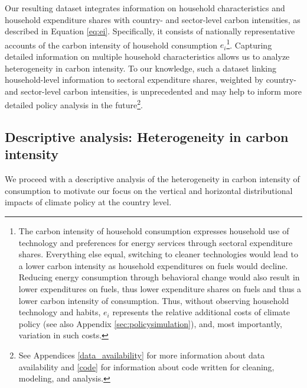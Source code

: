 \documentclass[12pt, a4paper]{article}
\begin{document}
Our resulting dataset integrates information on household characteristics and household expenditure shares with country- and sector-level carbon intensities, as described in Equation \ref{eq:ei}. Specifically, it consists of nationally representative accounts of the carbon intensity of household consumption $e_{i}$\footnote{The carbon intensity of household consumption expresses household use of technology and preferences for energy services through sectoral expenditure shares. Everything else equal, switching to cleaner technologies would lead to a lower carbon intensity as household expenditures on fuels would decline. Reducing energy consumption through behavioral change would also result in lower expenditures on fuels, thus lower expenditure shares on fuels and thus a lower carbon intensity of consumption. Thus, without observing household technology and habits, $e_{i}$ represents the relative additional costs of climate policy (see also Appendix \ref{sec:policysimulation}), and, most importantly, variation in such costs.}. Capturing detailed information on multiple household characteristics allows us to analyze heterogeneity in carbon intensity. To our knowledge, such a dataset linking household-level information to sectoral expenditure shares, weighted by country- and sector-level carbon intensities, is unprecedented and may help to inform more detailed policy analysis in the future\footnote{See Appendices \ref{data_availability} for more information about data availability and \ref{code} for information about code written for cleaning, modeling, and analysis.}.

\subsection{Descriptive analysis: Heterogeneity in carbon intensity} \label{sec:descriptive}

We proceed with a descriptive analysis of the heterogeneity in carbon intensity of consumption to motivate our focus on the vertical and horizontal distributional impacts of climate policy at the country level.
\end{document}
